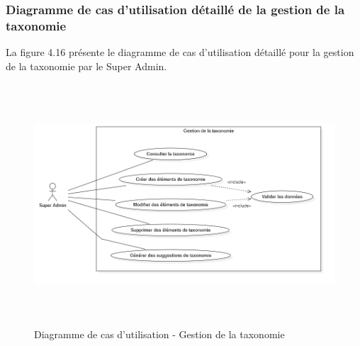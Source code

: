 \subsubsection{Diagramme de cas d'utilisation détaillé de la gestion de la taxonomie}
\noindent La figure 4.16 présente le diagramme de cas d'utilisation détaillé pour la gestion de la taxonomie par le Super Admin.

\begin{figure}[H]
    \centering
    \includegraphics[width=14cm,height=9cm]{images/taxonomyuc.png}
    \caption{Diagramme de cas d'utilisation - Gestion de la taxonomie}
\end{figure}

